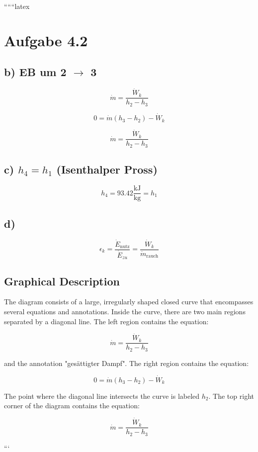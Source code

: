 ``````latex


\section*{Aufgabe 4.2}

\subsection*{b) EB um 2 $\rightarrow$ 3}

\[
\dot{m} = \frac{\dot{W}_k}{h_2 - h_3}
\]

\[
0 = \dot{m} (h_3 - h_2) - \dot{W}_k
\]

\[
\dot{m} = \frac{\dot{W}_k}{h_2 - h_3}
\]

\subsection*{c) $h_4 = h_1$ (Isenthalper Pross)}

\[
h_4 = 93.42 \frac{\text{kJ}}{\text{kg}} = h_1
\]

\subsection*{d)}

\[
\epsilon_k = \frac{\dot{E}_{\text{nutz}}}{\dot{E}_{zu}} = \frac{\dot{W}_k}{\dot{m}_{\text{rauch}}}
\]

\subsection*{Graphical Description}

The diagram consists of a large, irregularly shaped closed curve that encompasses several equations and annotations. Inside the curve, there are two main regions separated by a diagonal line. The left region contains the equation:

\[
\dot{m} = \frac{\dot{W}_k}{h_2 - h_3}
\]

and the annotation "gesättigter Dampf". The right region contains the equation:

\[
0 = \dot{m} (h_3 - h_2) - \dot{W}_k
\]

The point where the diagonal line intersects the curve is labeled $h_2$. The top right corner of the diagram contains the equation:

\[
\dot{m} = \frac{\dot{W}_k}{h_2 - h_3}
\]

```